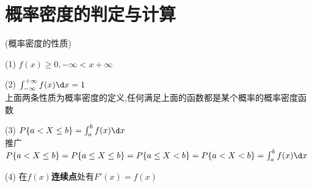 \documentclass[12pt, a4paper, oneside, UTF8]{ctexbook}
\begin{document}
\section{概率密度的判定与计算}
\begin{remark}
    (概率密度的性质)
    \item [(1)] $f(x)\geq 0, -\infty < x +\infty$ 
    \item [(2)] $\int_{-\infty}^{+\infty}f(x)\d x = 1$ \\
    上面两条性质为概率密度的定义,任何满足上面的函数都是某个概率的概率密度函数 
    \item [(3)] $P\{a<X\leq b\}=\int_{a}^{b}f(x)\d x$ \\
    推广$P\{a<X\leq b\}=P\{a\leq X\leq b\}=P\{a\leq X < b\} = P\{a<X <  b\} =\int_{a}^{b}f(x)\d x$ 
    \item [(4)] 在$f(x)$\textbf{连续点}处有$F'(x)=f(x)$ 
\end{remark}
\end{document}

